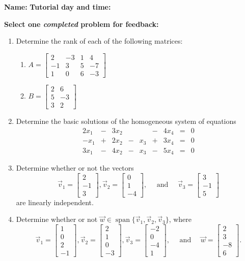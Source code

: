 \documentclass[12pt]{article}
\newcommand{\bbm}{\begin{bmatrix}}
\newcommand{\ebm}{\end{bmatrix}}
\begin{document}
{\bf \large Name:} \hspace{2.5in} {\bf Tutorial day and time:}

\bigskip

{\bf Select {\bf one} {\em completed} problem for feedback:}

\bigskip


\thispagestyle{fancy}
 \begin{enumerate}
\item Determine the rank of each of the following matrices:
\begin{multicols}{2}
\begin{enumerate}
 \item $A = \bbm 2&-3&1&4\\-1&3&5&-7\\1&0&6&-3\ebm$



 \item $B = \bbm 2&6\\5&-3\\3&2\ebm$



\end{enumerate}
\end{multicols}

\vspace{2.5in}

\item Determine the basic solutions of the homogeneous system of equations
\[
 \begin{array}{ccccccccc}
  2x_1&-&3x_2& &   &-&4x_4&=&0\\
  -x_1&+&2x_2&-&x_3&+&3x_4&=&0\\
  3x_1&-&4x_2&-&x_3&-&5x_4&=&0
 \end{array}
\]
\newpage

\item Determine whether or not the vectors
\[
 \vec{v}_1 = \bbm 2\\-1\\3\ebm, \vec{v}_2 = \bbm 0\\1\\-4\ebm, \quad \text{ and } \quad \vec{v}_3 = \bbm 3\\-1\\5\ebm
\]
are linearly independent.

\vspace{3in}

\item Determine whether or not $\vec{w}\in \operatorname{span}\{\vec{v}_1,\vec{v}_2, \vec{v}_3\}$, where
\[
 \vec{v}_1 = \bbm 1\\0\\2\\-1\ebm, \vec{v}_2 = \bbm 2\\1\\0\\-3\ebm, \vec{v}_3 = \bbm -2\\0\\-4\\1\ebm, \quad \text{ and } \quad \vec{w} = \bbm 2\\3\\-8\\6\ebm.
\]


 \end{enumerate}
\end{document}
